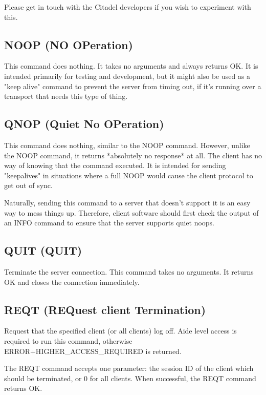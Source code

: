  Please get in touch with the Citadel developers if you wish to experiment with
this.



\subsection{NOOP (NO OPeration)}

 This command does nothing.  It takes no arguments and always returns
OK.  It is intended primarily for testing and development, but it might also
be used as a "keep alive" command to prevent the server from timing out, if
it's running over a transport that needs this type of thing.



\subsection{QNOP (Quiet No OPeration)}

 This command does nothing, similar to the NOOP command.  However, unlike the
NOOP command, it returns *absolutely no response* at all.  The client has no
way of knowing that the command executed.  It is intended for sending
"keepalives" in situations where a full NOOP would cause the client protocol
to get out of sync.

 Naturally, sending this command to a server that doesn't support it is an
easy way to mess things up.  Therefore, client software should first check
the output of an INFO command to ensure that the server supports quiet noops.



\subsection{QUIT (QUIT)}

 Terminate the server connection.  This command takes no arguments.  It
returns OK and closes the connection immediately.




\subsection{REQT (REQuest client Termination)}

 Request that the specified client (or all clients) log off.  Aide level
access is required to run this command, otherwise ERROR+HIGHER_ACCESS_REQUIRED
is returned.

 The REQT command accepts one parameter: the session ID of the client which
should be terminated, or 0 for all clients.  When successful, the REQT command
returns OK.

